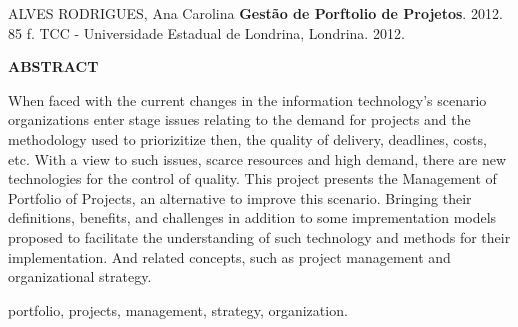 \singlespacing
\noindent ALVES RODRIGUES,  Ana Carolina  {\bf Gest\~ao de Porftolio de Projetos}. 2012. 85 f. TCC - Universidade Estadual de Londrina, Londrina. 2012. \\
\begin{center}
{\bf {\Large ABSTRACT}}
\end{center}
When faced with the current changes in the information technology's scenario organizations enter stage issues relating to the demand for projects and the 
methodology used to priorizitize then, the quality of delivery, deadlines, costs, etc. With a view to such issues, scarce resources and high demand, there 
are new technologies for the control of quality. This project presents the Management of Portfolio of Projects, an alternative to improve this scenario. 
Bringing their definitions, benefits, and challenges in addition to some imprementation models proposed to facilitate the understanding of such technology 
and methods for their implementation. And related concepts, such as project management and organizational strategy.
\newline

  portfolio, projects, management, strategy, organization.
 
